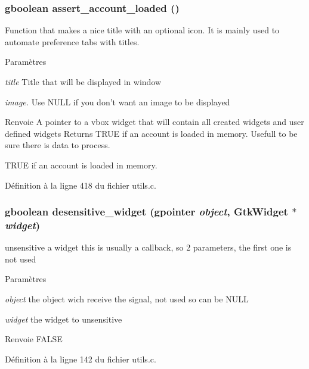 \subsubsection[{assert\_\-account\_\-loaded}]{\setlength{\rightskip}{0pt plus 5cm}gboolean assert\_\-account\_\-loaded ()}\label{utils_8h_a201366e3a41e970cd3009d8b5d7afdd0}
Function that makes a nice title with an optional icon. It is mainly used to automate preference tabs with titles.


\begin{DoxyParams}{Paramètres}
\item[{\em title}]Title that will be displayed in window \item[{\em image.}]Use NULL if you don't want an image to be displayed\end{DoxyParams}
\begin{DoxyReturn}{Renvoie}
A pointer to a vbox widget that will contain all created widgets and user defined widgets Returns TRUE if an account is loaded in memory. Usefull to be sure there is data to process.

TRUE if an account is loaded in memory. 
\end{DoxyReturn}


Définition à la ligne 418 du fichier utils.c.

\subsubsection[{desensitive\_\-widget}]{\setlength{\rightskip}{0pt plus 5cm}gboolean desensitive\_\-widget (gpointer {\em object}, \/  GtkWidget $\ast$ {\em widget})}\label{utils_8h_a2c94bcb7fbf8bc4dc28ae7ab24425a62}
unsensitive a widget this is usually a callback, so 2 parameters, the first one is not used


\begin{DoxyParams}{Paramètres}
\item[{\em object}]the object wich receive the signal, not used so can be NULL \item[{\em widget}]the widget to unsensitive\end{DoxyParams}
\begin{DoxyReturn}{Renvoie}
FALSE 
\end{DoxyReturn}


Définition à la ligne 142 du fichier utils.c.

